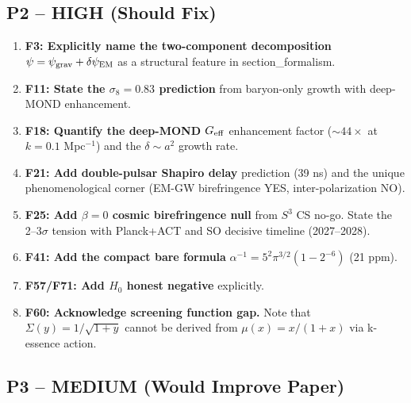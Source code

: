 \documentclass[11pt,a4paper]{article}
\begin{document}
\subsection{P2 -- HIGH (Should Fix)}

\begin{enumerate}
\item \textbf{F3: Explicitly name the two-component decomposition} $\psi = \psi_{\rm grav} + \delta\psi_{\rm EM}$ as a structural feature in section\_formalism.

\item \textbf{F11: State the $\sigma_8 = 0.83$ prediction} from baryon-only growth with deep-MOND enhancement.

\item \textbf{F18: Quantify the deep-MOND $G_{\rm eff}$} enhancement factor ($\sim 44\times$ at $k = 0.1$ Mpc$^{-1}$) and the $\delta \sim a^2$ growth rate.

\item \textbf{F21: Add double-pulsar Shapiro delay} prediction (39 ns) and the unique phenomenological corner (EM-GW birefringence YES, inter-polarization NO).

\item \textbf{F25: Add $\beta = 0$ cosmic birefringence null} from $S^3$ CS no-go. State the 2--3$\sigma$ tension with Planck+ACT and SO decisive timeline (2027--2028).

\item \textbf{F41: Add the compact bare formula} $\alpha^{-1} = 5^2\pi^{3/2}(1-2^{-6})$ (21 ppm).

\item \textbf{F57/F71: Add $H_0$ honest negative} explicitly.

\item \textbf{F60: Acknowledge screening function gap.} Note that $\Sigma(y) = 1/\sqrt{1+y}$ cannot be derived from $\mu(x) = x/(1+x)$ via k-essence action.
\end{enumerate}

\subsection{P3 -- MEDIUM (Would Improve Paper)}
\end{document}
